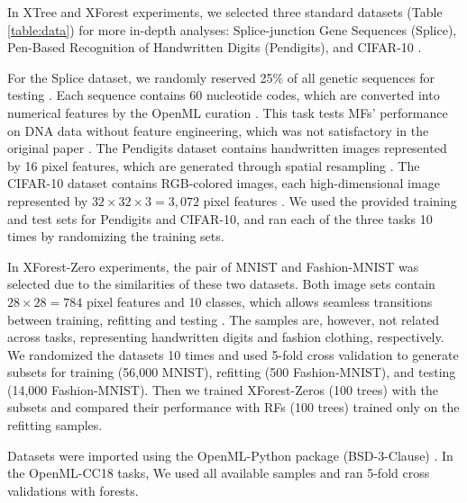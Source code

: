 In XTree and XForest experiments, we selected three standard datasets (Table \ref{table:data}) for more in-depth analyses: Splice-junction Gene Sequences (Splice), Pen-Based Recognition of Handwritten Digits (Pendigits), and CIFAR-10 \citep{towell_molecular_1991, alpaydin_pen-based_1998, krizhevsky_learning_2012, lavanya_handwritten_2017}.

For the Splice dataset, we randomly reserved 25\% of all genetic sequences for testing \citep{rampone_splice-junction_1998, sarkar_splice_2020}. Each sequence contains 60 nucleotide codes, which are converted into numerical features by the OpenML curation \citep{feurer_openml-python_2019}. This task tests MFs' performance on DNA data without feature engineering, which was not satisfactory in the original paper \citep{lakshminarayanan_mondrian_2014}. 
The Pendigits dataset contains handwritten images represented by 16 pixel features, which are generated through spatial resampling \citep{alimoglu_methods_1996}.
The CIFAR-10 dataset contains RGB-colored images, each high-dimensional image represented by $32 \times 32 \times 3 = 3,072$ pixel features \citep{krizhevsky_learning_2012}. We used the provided training and test sets for Pendigits and CIFAR-10, and ran each of the three tasks 10 times by randomizing the training sets. 

In XForest-Zero experiments, the pair of MNIST and Fashion-MNIST was selected due to the similarities of these two datasets. Both image sets contain $28 \times 28 = 784$ pixel features and 10 classes, which allows seamless transitions between training, refitting and testing \citep{lecun_gradient-based_1998, xiao_fashion-mnist_2017}. The samples are, however, not related across tasks, representing handwritten digits and fashion clothing, respectively. We randomized the datasets 10 times and used 5-fold cross validation to generate subsets for training (56,000 MNIST), refitting (500 Fashion-MNIST), and testing (14,000 Fashion-MNIST). Then we trained XForest-Zeros (100 trees) with the subsets and compared their performance with RFs (100 trees) trained only on the refitting samples.

Datasets were imported using the OpenML-Python package (BSD-3-Clause) \citep{feurer_openml-python_2019}. In the OpenML-CC18 tasks, We used all available samples and ran 5-fold cross validations with forests.

